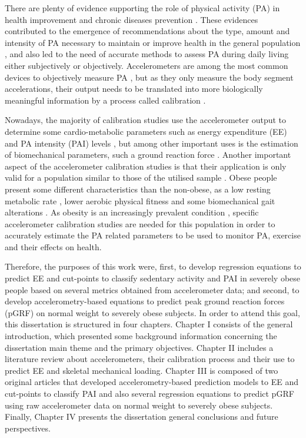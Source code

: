 There are plenty of evidence supporting the role of physical activity (PA) in health improvement and chronic diseases prevention \cite{Guthold_2018, Warburton_2017, Warburton_2006}. These evidences contributed to the emergence of recommendations about the type, amount and intensity of PA necessary to maintain  or improve health in the general population \cite{WHO_2010}, and also led to the need of accurate methods to assess PA during daily living \cite{Montoye_2000, Plasqui_2013} either subjectively or objectively. Accelerometers are among the most common devices to objectively measure PA \cite{Strath_2013}, but as they only measure the body segment accelerations, their output needs to be translated into more biologically meaningful information by a process called calibration \cite{Welk_2005}.
 
 Nowadays, the majority of calibration studies use the accelerometer output to determine some cardio-metabolic parameters such as energy expenditure (EE) and PA intensity (PAI) levels \cite{Migueles_2017}, but among other important uses is the estimation of biomechanical parameters, such a ground reaction force \cite{Neugebauer_2014}. Another important aspect of the accelerometer calibration studies is that their application is only valid for a population similar to those of the utilised sample \cite{Welk_2005}. Obese people present some different characteristics than the non-obese, as a low resting metabolic rate \cite{Byrne_2005}, lower aerobic physical fitness \cite{Souza_2010} and some biomechanical gait alterations \cite{Bode_2019}. As obesity is an increasingly prevalent condition \cite{Guthold_2018}, specific accelerometer calibration studies are needed for this population in order to accurately estimate the PA related parameters to be used to monitor PA, exercise and their effects on health.

Therefore, the purposes of this work were, first, to develop regression equations to predict EE and cut-points to classify sedentary activity and PAI in severely obese people based on several metrics obtained from accelerometer data; and second, to develop accelerometry-based equations to predict peak ground reaction forces (pGRF) on normal weight to severely obese subjects. In order to attend this goal, this dissertation is structured in four chapters. Chapter I consists of the general introduction, which presented some background information concerning the dissertation main theme and the primary objectives. Chapter II includes a literature review about accelerometers, their calibration process and their use to predict EE and skeletal mechanical loading. Chapter III is composed of two original articles that developed accelerometry-based prediction models to EE and cut-points to classify PAI and also several regression equations to predict pGRF using raw accelerometer data on normal weight to severely obese subjects. Finally, Chapter IV presents the  dissertation general conclusions and future perspectives.